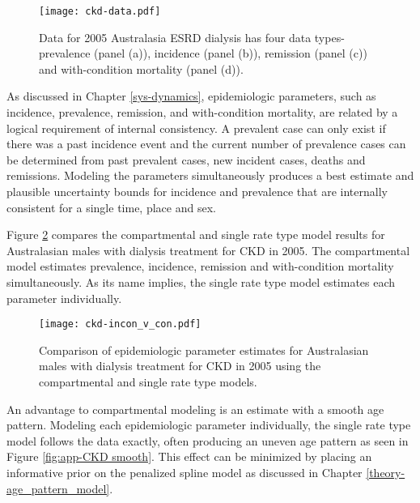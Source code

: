     \begin{figure}[h]
        \begin{center}
            \texttt{[image: ckd-data.pdf]}
            \caption{Data for 2005 Australasia ESRD dialysis has four data types-prevalence (panel (a)), incidence (panel (b)), remission (panel (c)) and with-condition mortality (panel (d)).}
            \label{fig:app-CKD data}
        \end{center}
    \end{figure}

As discussed in Chapter \ref{sys-dynamics}, epidemiologic parameters, such as incidence, prevalence, remission, and with-condition mortality, are related by a logical requirement of internal consistency.  A prevalent case can only exist if there was a past incidence event and the current number of prevalence cases can be determined from past prevalent cases, new incident cases, deaths and remissions.  Modeling the parameters simultaneously produces a best estimate and plausible uncertainty bounds for incidence and prevalence that are internally consistent for a single time, place and sex.

Figure \ref{fig:app-CKD incon v con} compares the compartmental and single rate type model results for Australasian males with dialysis treatment for CKD in 2005.  The compartmental model estimates prevalence, incidence, remission and with-condition mortality simultaneously.  As its name implies, the single rate type model estimates each parameter individually.

    \begin{figure}[h]
        \begin{center}
            \texttt{[image: ckd-incon\_v\_con.pdf]}
            \caption{Comparison of epidemiologic parameter estimates for Australasian males with dialysis treatment for CKD in 2005 using the compartmental and single rate type models.}
            \label{fig:app-CKD incon v con}
        \end{center}
    \end{figure}

An advantage to compartmental modeling is an estimate with a smooth age pattern. Modeling each epidemiologic parameter individually, the single rate type model follows the data exactly, often producing an uneven age pattern as seen in Figure \ref{fig:app-CKD smooth}.  This effect can be minimized by placing an informative prior on the penalized spline model as discussed in Chapter \ref{theory-age_pattern_model}.

